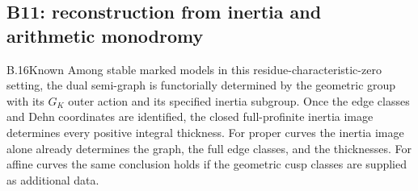 

\subsection{B11: reconstruction from inertia and arithmetic monodromy}

\begin{claim}{B.16}{Known}
Among stable marked models in this residue-characteristic-zero setting,
the dual semi-graph is functorially determined by the geometric group with
its $G_K$ outer action and its specified inertia subgroup. Once the
edge classes and Dehn coordinates are identified, the closed full-profinite
inertia image determines every positive integral thickness.
For proper curves the inertia image alone already determines the graph,
the full edge classes, and the thicknesses. For affine curves the same
conclusion holds if the geometric cusp classes are supplied as additional
data.
\end{claim}
